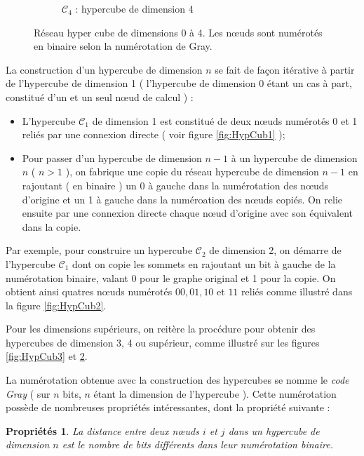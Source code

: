 \documentclass[fleqn,11pt]{article}
\newtheorem{prop}{Propriétés }
\begin{document}
\begin{itemize}
\begin{itemize}
\begin{figure}[h]
\begin{subfigure}[c]{0.46\textwidth}
\caption{$\mathcal{C}_{4}$ : hypercube de dimension 4}\label{fig:HypCub4}
\end{subfigure}
\caption{Réseau hyper cube de dimensions 0 à 4. Les nœuds sont numérotés en binaire selon la numérotation de Gray.}
\end{figure}

La construction d'un hypercube de dimension $n$ se fait de façon itérative à partir de l'hypercube de
dimension 1 ( l'hypercube de dimension 0 étant un cas à part, constitué d'un et un seul nœud de calcul ) :

\begin{itemize}
\item L'hypercube $\mathcal{C}_{1}$ de dimension 1 est constitué de deux nœuds numérotés 0 et 1 
reliés par une connexion directe ( voir figure \ref{fig:HypCub1} );
\item Pour passer d'un hypercube de dimension $n-1$ à un hypercube de dimension $n$ ( $n>1$ ), on fabrique
une copie du réseau hypercube de dimension $n-1$ en rajoutant ( en binaire ) un 0 à gauche dans la numérotation
des nœuds d'origine et un 1 à gauche dans la numéroation des nœuds copiés. On relie ensuite par une
connexion directe chaque nœud d'origine avec son équivalent dans la copie.
\end{itemize}

Par exemple, pour construire un hypercube $\mathcal{C}_{2}$ de dimension 2, 
on démarre de l'hypercube $\mathcal{C}_{1}$ dont on copie les sommets en rajoutant
un bit à gauche de la numérotation binaire, valant 0 pour le graphe original et
1 pour la copie. On obtient ainsi quatres nœuds numérotés $00,01,10$ et $11$
reliés comme illustré dans la figure \ref{fig:HypCub2}.

Pour les dimensions supérieurs, on reitère la procédure pour obtenir des hypercubes de dimension
3, 4 ou supérieur, comme illustré sur les figures \ref{fig:HypCub3} et \ref{fig:HypCub4}.

La numérotation obtenue avec la construction des hypercubes se nomme le \textsl{code Gray} ( sur $n$
bits, $n$ étant la dimension de l'hypercube ). Cette numérotation possède de nombreuses propriétés
intéressantes, dont la propriété suivante :

\begin{prop}
La distance entre deux nœuds $i$ et $j$ dans un hypercube de dimension $n$ est le nombre de bits différents
dans leur numérotation binaire.
\end{prop}


\end{itemize}
\end{itemize}
\end{document}
